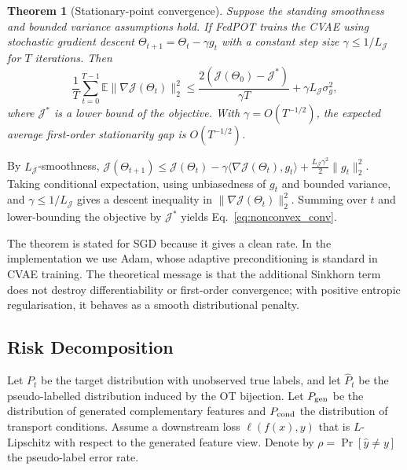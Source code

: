 \documentclass[a4paper,fleqn]{cas-sc}
\newtheorem{theorem}{Theorem}
\begin{document}
\begin{theorem}[Stationary-point convergence]
  Suppose the standing smoothness and bounded variance assumptions hold.
  If FedPOT trains the CVAE using stochastic gradient descent
  $\Theta_{t+1}=\Theta_t-\gamma g_t$ with a constant step size
  $\gamma \leq 1/L_{\mathcal{J}}$ for $T$ iterations. Then
  \begin{equation}
    \frac{1}{T}\sum_{t=0}^{T-1}
    \mathbb{E}\|\nabla\mathcal{J}(\Theta_t)\|_2^2
    \leq
    \frac{2(\mathcal{J}(\Theta_0)-\mathcal{J}^*)}{\gamma T}
    + \gamma L_{\mathcal{J}}\sigma_g^2,
    \label{eq:nonconvex_conv}
  \end{equation}
  where $\mathcal{J}^*$ is a lower bound of the objective. With
  $\gamma=O(T^{-1/2})$, the expected average first-order stationarity gap is
  $O(T^{-1/2})$.
  \label{thm:cvae_convergence}
\end{theorem}

\begin{pf}
  By $L_{\mathcal{J}}$-smoothness,
  $\mathcal{J}(\Theta_{t+1})\leq \mathcal{J}(\Theta_t)
  -\gamma\langle\nabla\mathcal{J}(\Theta_t),g_t\rangle
  +\frac{L_{\mathcal{J}}\gamma^2}{2}\|g_t\|_2^2$.
  Taking conditional expectation, using unbiasedness of $g_t$ and bounded
  variance, and $\gamma\leq1/L_{\mathcal{J}}$ gives a descent inequality in
  $\|\nabla\mathcal{J}(\Theta_t)\|_2^2$. Summing over $t$ and lower-bounding
  the objective by $\mathcal{J}^*$ yields Eq.~\eqref{eq:nonconvex_conv}.
\end{pf}

\begin{remark}
  The theorem is stated for SGD because it gives a clean rate. In the
  implementation we use Adam, whose adaptive preconditioning is standard in
  CVAE training. The theoretical message is that the additional Sinkhorn term
  does not destroy differentiability or first-order convergence; with positive
  entropic regularisation, it behaves as a smooth distributional penalty.
\end{remark}

\subsection{Risk Decomposition}

Let $P_t$ be the target distribution with unobserved true labels, and let
$\hat P_t$ be the pseudo-labelled distribution induced by the OT bijection.
Let $P_{\rm gen}$ be the distribution of generated complementary features and
$P_{\rm cond}$ the distribution of transport conditions. Assume a downstream
loss $\ell(f(x),y)$ that is $L$-Lipschitz with respect to the generated feature
view. Denote by $\rho=\Pr[\hat y\neq y]$ the pseudo-label error rate.
\end{document}

